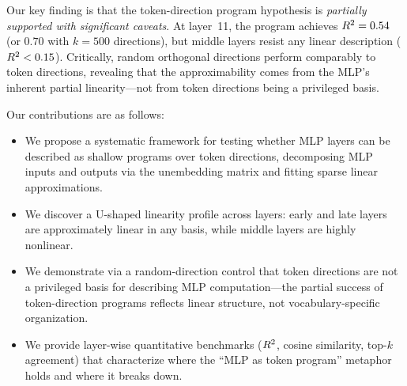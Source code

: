 Our key finding is that the token-direction program hypothesis is \emph{partially supported with significant caveats}.
At layer~11, the program achieves $R^2=0.54$ (or $0.70$ with $k=500$ directions), but middle layers resist any linear description ($R^2 < 0.15$).
Critically, random orthogonal directions perform comparably to token directions, revealing that the approximability comes from the MLP's inherent partial linearity---not from token directions being a privileged basis.

Our contributions are as follows:
\begin{itemize}[leftmargin=*,itemsep=0pt,topsep=0pt]
    \item We propose a systematic framework for testing whether MLP layers can be described as shallow programs over token directions, decomposing MLP inputs and outputs via the unembedding matrix and fitting sparse linear approximations.
    \item We discover a U-shaped linearity profile across layers: early and late layers are approximately linear in any basis, while middle layers are highly nonlinear.
    \item We demonstrate via a random-direction control that token directions are not a privileged basis for describing MLP computation---the partial success of token-direction programs reflects linear structure, not vocabulary-specific organization.
    \item We provide layer-wise quantitative benchmarks ($R^2$, cosine similarity, top-$k$ agreement) that characterize where the ``MLP as token program'' metaphor holds and where it breaks down.
\end{itemize}
